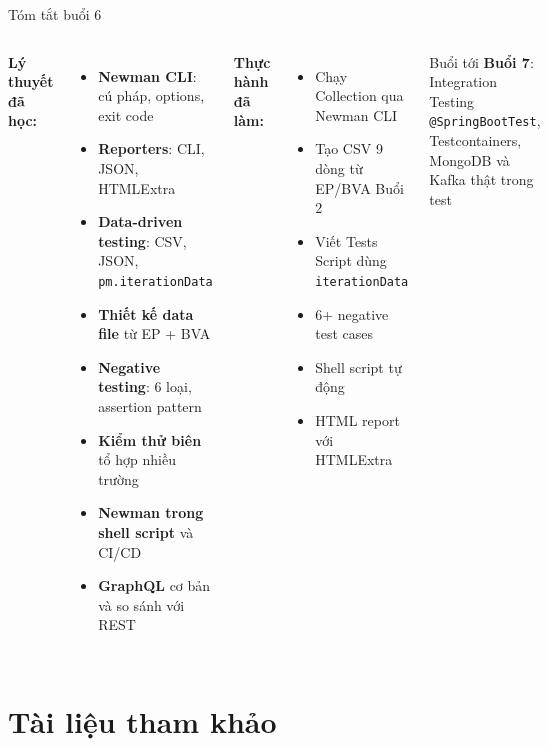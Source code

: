 \documentclass[aspectratio=169,10pt]{beamer}
\begin{document}
\begin{frame}{Tóm tắt buổi 6}
  \begin{columns}
    \textbf{Lý thuyết đã học:}
    \begin{itemize}
      \item \textbf{Newman CLI}: cú pháp, options, exit code
      \item \textbf{Reporters}: CLI, JSON, HTMLExtra
      \item \textbf{Data-driven testing}: CSV, JSON, \texttt{pm.iterationData}
      \item \textbf{Thiết kế data file} từ EP + BVA
      \item \textbf{Negative testing}: 6 loại, assertion pattern
      \item \textbf{Kiểm thử biên} tổ hợp nhiều trường
      \item \textbf{Newman trong shell script} và CI/CD
      \item \textbf{GraphQL} cơ bản và so sánh với REST
    \end{itemize}

    \textbf{Thực hành đã làm:}
    \begin{itemize}
      \item Chạy Collection qua Newman CLI
      \item Tạo CSV 9 dòng từ EP/BVA Buổi 2
      \item Viết Tests Script dùng \texttt{iterationData}
      \item 6+ negative test cases
      \item Shell script tự động
      \item HTML report với HTMLExtra
    \end{itemize}

    \vspace{0.3em}
    \begin{block}{Buổi tới}
      \textbf{Buổi 7}: Integration Testing\\
      \texttt{@SpringBootTest}, Testcontainers,\\
      MongoDB và Kafka thật trong test
    \end{block}
  \end{columns}
\end{frame}

\section{Tài liệu tham khảo}
\end{document}
